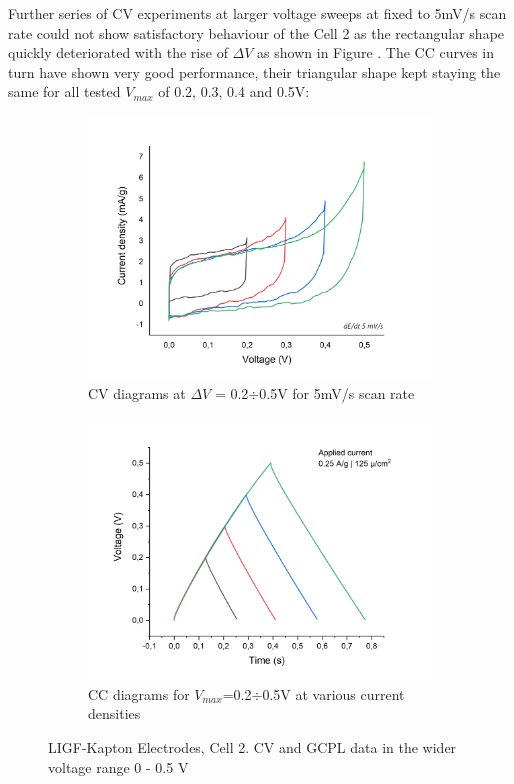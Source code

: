 Further series of CV experiments at larger voltage sweeps at fixed to 5mV/s scan rate could not show satisfactory behaviour of the Cell 2 as the rectangular shape quickly deteriorated with the rise of $\Delta V$ as shown in Figure . The CC curves in turn have shown very good performance, their triangular shape kept staying the same for all tested $V_{max}$ of 0.2, 0.3, 0.4 and 0.5\:V: 

\begin{figure}[H]
\begin{subfigure}{0.49\textwidth}
\includegraphics[width=1\textwidth]{Figures/Results/Electrochemistry/LIGF-PI-NaNO3-Swagelok/Cell2/CV-high-5mVs.jpg} 
\captionsetup{width=0.9\linewidth}
\caption{CV diagrams at $\Delta V$ = 0.2$\div$0.5\:V for 5\:mV/s scan rate}
\label{fig:LIGF-PI-cell2-CV06}
\end{subfigure}
\begin{subfigure}{0.49\textwidth}
\includegraphics[width=1\textwidth]{Figures/Results/Electrochemistry/LIGF-PI-NaNO3-Swagelok/Cell2/GCPL-high-V.jpg}
\captionsetup{width=0.9\linewidth}
\caption{CC diagrams for $V_{max}$=0.2$\div$0.5\:V at various current densities}
\label{fig:LIGF-PI-cell2-CC06}
\end{subfigure}
\medskip
\caption{LIGF-Kapton Electrodes, Cell 2. CV and GCPL data in the wider voltage range 0 - 0.5 V}
\label{fig:LIGF-PI-cell2-06}
\end{figure}

